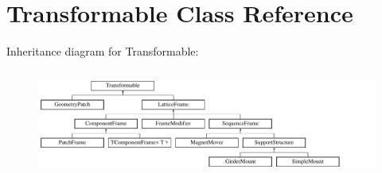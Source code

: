 \hypertarget{classTransformable}{}\section{Transformable Class Reference}
\label{classTransformable}
Inheritance diagram for Transformable\+:\begin{figure}[H]
\begin{center}
\leavevmode
\includegraphics[height=3.566879cm]{classTransformable}
\end{center}
\end{figure}
